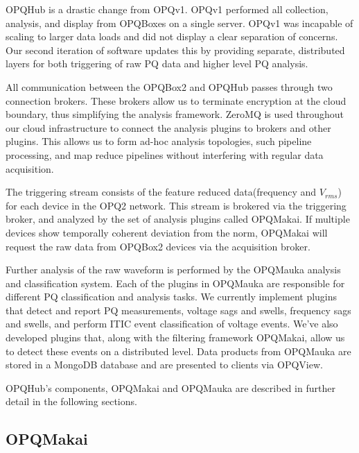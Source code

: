 \documentclass[a4paper, conference]{IEEEtran}
\begin{document}
OPQHub is a drastic change from OPQv1. OPQv1 performed all collection, analysis, and display from OPQBoxes on a single server. OPQv1 was incapable of scaling to larger data loads and did not display a clear separation of concerns. Our second iteration of software updates this by providing separate, distributed layers for both triggering of raw PQ data and higher level PQ analysis.

All communication between the OPQBox2 and OPQHub passes through two connection brokers. These brokers allow us to terminate encryption at the cloud boundary, thus simplifying the analysis framework. ZeroMQ is used throughout our cloud infrastructure to connect the analysis plugins to brokers and other plugins. This allows us to form ad-hoc analysis topologies, such pipeline processing, and map reduce pipelines without interfering with regular data acquisition.

The triggering stream consists of the feature reduced data(frequency and $V_{rms}$) for each device in the OPQ2 network. This stream is brokered via the triggering broker, and analyzed by the set of analysis plugins called OPQMakai. If multiple devices show temporally coherent deviation from the norm, OPQMakai will request the raw data from OPQBox2 devices via the acquisition broker. 

Further analysis of the raw waveform is performed by the OPQMauka analysis and classification system. Each of the plugins in OPQMauka are responsible for different PQ classification and analysis tasks. We currently implement plugins that detect and report PQ measurements, voltage sags and swells, frequency sags and swells, and perform ITIC event classification of voltage events. We've also developed plugins that, along with the filtering framework OPQMakai, allow us to detect these events on a distributed level. Data products from OPQMauka are stored in a MongoDB database and are presented to clients via OPQView.

OPQHub's components, OPQMakai and OPQMauka are described in further detail in the following sections.

\subsection{OPQMakai}
\end{document}
